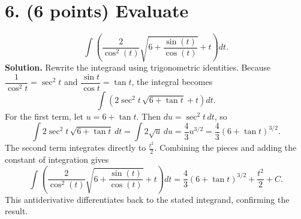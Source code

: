 \documentclass[12pt]{article}
\begin{document}
\newpage

\section*{6. (6 points) Evaluate}
\[ \int \left( \frac{2}{\cos^2(t)} \sqrt{6 + \frac{\sin(t)}{\cos(t)}} + t \right) dt. \]
{\color{blue}\textbf{Solution.} Rewrite the integrand using trigonometric identities. Because $\dfrac{1}{\cos^2 t}=\sec^2 t$ and $\dfrac{\sin t}{\cos t}=\tan t$, the integral becomes
\[
    \int\left(2\sec^2 t\,\sqrt{6+\tan t}+t\right)dt.
\]
For the first term, let $u=6+\tan t$. Then $du=\sec^2 t\,dt$, so
\[
    \int 2\sec^2 t\,\sqrt{6+\tan t}\,dt=\int 2\sqrt{u}\,du=\frac{4}{3}u^{3/2}=\frac{4}{3}(6+\tan t)^{3/2}.
\]
The second term integrates directly to $\tfrac{t^2}{2}$. Combining the pieces and adding the constant of integration gives
\[
    \int \left( \frac{2}{\cos^2(t)} \sqrt{6 + \frac{\sin(t)}{\cos(t)}} + t \right) dt = \frac{4}{3}\left(6+\tan t\right)^{3/2}+\frac{t^2}{2}+C.
\]
This antiderivative differentiates back to the stated integrand, confirming the result.}
\end{document}
